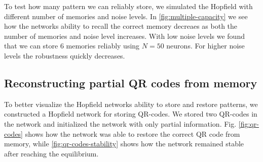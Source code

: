 To test how many pattern we can reliably store, we simulated the Hopfield with different number of memories and noise levels. In \cref{fig:multiple-capacity} we see how the networks ability to recall the correct memory decreaes as both the number of memories and noise level increases. With low noise levels we found that we can store $6$ memories reliably using $N=50$ neurons. For higher noise levels the robustness quickly decreases.
 

\subsection{Reconstructing partial QR codes from memory} \label{sec:qr-codes}
To better visualize the Hopfield networks ability to store and restore patterns, we constructed a Hopfield network for storing QR-codes. We stored two QR-codes in the network and initialized the network with only partial information. Fig. \ref{fig:qr-codes} shows how the network was able to restore the correct QR code from memory, while \cref{fig:qr-codes-stability} shows how the network remained stable after reaching the equilibrium. 

